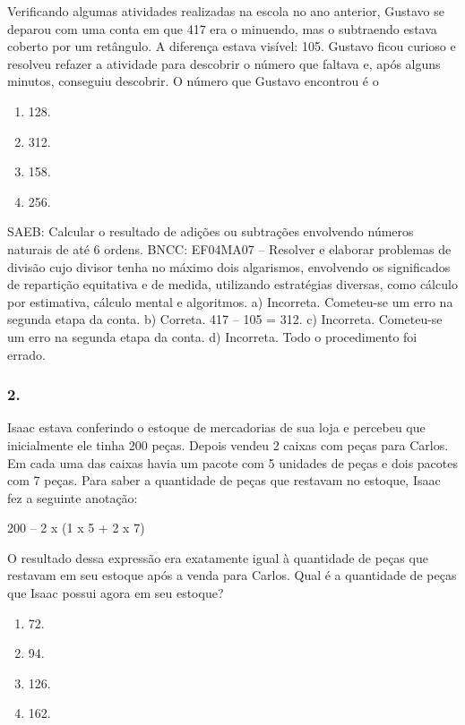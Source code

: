 \begin{enumerate}
\begin{escolha}
Verificando algumas atividades realizadas na escola no ano anterior,
Gustavo se deparou com uma conta em que 417 era o minuendo, mas o subtraendo
estava coberto por um retângulo. A diferença estava visível: 105.
Gustavo ficou curioso e resolveu refazer a atividade para descobrir o
número que faltava e, após alguns minutos, conseguiu descobrir. O número
que Gustavo encontrou é o

\begin{enumerate}
\def\labelenumi{\alph{enumi})}
\item
  128.
\item
  312.
\item
  158.
\item
  256.
\end{enumerate}

SAEB: Calcular o resultado de adições ou subtrações envolvendo números naturais de até 6 ordens.
BNCC: EF04MA07 -- Resolver e elaborar problemas de divisão cujo divisor tenha no máximo dois algarismos,
envolvendo os significados de repartição equitativa e de medida, utilizando estratégias diversas,
como cálculo por estimativa, cálculo mental e algoritmos.
a) Incorreta. Cometeu-se um erro na segunda etapa da conta.
b) Correta. 417 – 105 = 312.
c) Incorreta. Cometeu-se um erro na segunda etapa da conta.
d) Incorreta. Todo o procedimento foi errado.


\subsubsection{2.}\label{section-24}

Isaac estava conferindo o estoque de mercadorias de sua loja e percebeu
que inicialmente ele tinha 200 peças. Depois vendeu 2 caixas com peças
para Carlos. Em cada uma das caixas havia um pacote com 5 unidades de peças e dois
pacotes com 7 peças. Para saber a quantidade de peças que restavam no estoque, Isaac fez a
seguinte anotação:

200 -- 2 x (1 x 5 + 2 x 7)

O resultado dessa expressão era exatamente igual à quantidade de peças
que restavam em seu estoque após a venda para Carlos. Qual é a
quantidade de peças que Isaac possui agora em seu estoque?

\begin{enumerate}
\def\labelenumi{\alph{enumi})}
\item
  72.
\item
  94.
\item
  126.
\item
  162.
\end{enumerate}


\end{escolha}
\end{enumerate}
